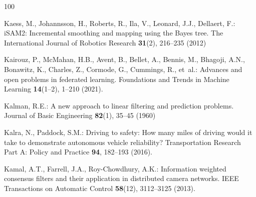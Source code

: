 \documentclass[graybox,envcountchap]{style/SNmono}
\begin{document}
\begin{thebibliography}{100}
{\par}
{\color{red} 
Kaess, M., Johannsson, H., Roberts, R., Ila, V., Leonard, J.J., Dellaert, F.:
  {iSAM2}: Incremental smoothing and mapping using the {B}ayes tree.
\newblock The International Journal of Robotics Research \textbf{31}(2),
  216--235 (2012)

\par}

Kairouz, P., McMahan, H.B., Avent, B., Bellet, A., Bennis, M., Bhagoji, A.N.,
  Bonawitz, K., Charles, Z., Cormode, G., Cummings, R., et~al.: Advances and
  open problems in federated learning.
\newblock Foundations and Trends in Machine Learning \textbf{14}(1--2), 1--210
  (2021).
\newblock {}


{\color{red} 
Kalman, R.E.: A new approach to linear filtering and prediction problems.
\newblock Journal of Basic Engineering \textbf{82}(1), 35--45 (1960)

\par}

Kalra, N., Paddock, S.M.: Driving to safety: How many miles of driving would it
  take to demonstrate autonomous vehicle reliability?
\newblock Transportation Research Part A: Policy and Practice \textbf{94},
  182--193 (2016).
\newblock {}



Kamal, A.T., Farrell, J.A., Roy-Chowdhury, A.K.: Information weighted consensus
  filters and their application in distributed camera networks.
\newblock IEEE Transactions on Automatic Control \textbf{58}(12), 3112--3125
  (2013).
\newblock {}



\end{thebibliography}
\end{document}
